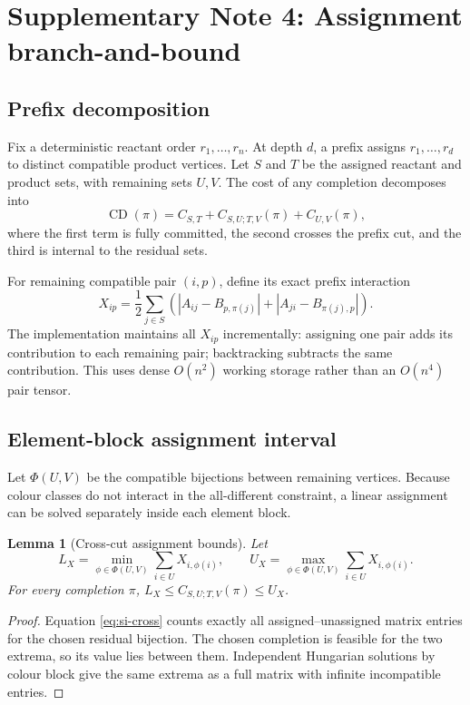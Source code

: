 \documentclass[11pt]{article}
\newtheorem{lemma}[theorem]{Lemma}
\theoremstyle{definition}
\newcommand{\CD}{\operatorname{CD}}
\begin{document}
\section{Supplementary Note 4: Assignment branch-and-bound}

\subsection{Prefix decomposition}

Fix a deterministic reactant order \(r_1,\ldots,r_n\).  At depth \(d\), a
prefix assigns \(r_1,\ldots,r_d\) to distinct compatible product vertices.
Let \(S\) and \(T\) be the assigned reactant and product sets, with remaining
sets \(U,V\).  The cost of any completion decomposes into
\[
 \CD(\pi)=C_{S,T}+C_{S,U;T,V}(\pi)+C_{U,V}(\pi),
\]
where the first term is fully committed, the second crosses the prefix cut,
and the third is internal to the residual sets.

For remaining compatible pair \((i,p)\), define its exact prefix interaction
\begin{equation}
 X_{ip}=\frac12\sum_{j\in S}
 \left(|A_{ij}-B_{p,\pi(j)}|+|A_{ji}-B_{\pi(j),p}|\right).
 \label{eq:si-cross}
\end{equation}
The implementation maintains all \(X_{ip}\) incrementally: assigning one
pair adds its contribution to each remaining pair; backtracking subtracts the
same contribution.  This uses dense \(O(n^2)\) working storage rather than an
\(O(n^4)\) pair tensor.

\subsection{Element-block assignment interval}

Let \(\Phi(U,V)\) be the compatible bijections between remaining vertices.
Because colour classes do not interact in the all-different constraint, a
linear assignment can be solved separately inside each element block.

\begin{lemma}[Cross-cut assignment bounds]
Let
\[
 L_X=\min_{\phi\in\Phi(U,V)}\sum_{i\in U}X_{i,\phi(i)},\qquad
 U_X=\max_{\phi\in\Phi(U,V)}\sum_{i\in U}X_{i,\phi(i)}.
\]
For every completion \(\pi\),
\(L_X\leq C_{S,U;T,V}(\pi)\leq U_X\).
\end{lemma}

\begin{proof}
Equation \eqref{eq:si-cross} counts exactly all assigned--unassigned matrix
entries for the chosen residual bijection.  The chosen completion is feasible
for the two extrema, so its value lies between them.  Independent Hungarian
solutions by colour block give the same extrema as a full matrix with
infinite incompatible entries.
\end{proof}
\end{document}
